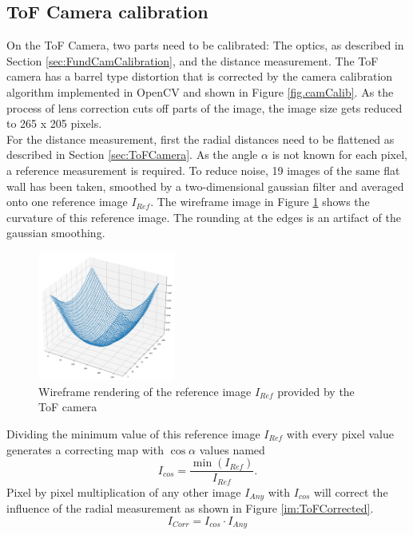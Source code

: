 \subsection{ToF Camera calibration}
\label{sec:ToFCalibration}
On the ToF Camera, two parts need to be calibrated: The optics, as described in Section \ref{sec:FundCamCalibration}, and the distance measurement. The ToF camera has a barrel type distortion that is corrected by the camera calibration algorithm implemented in OpenCV\cite{openCVCamCalib} and shown in Figure \ref{fig.camCalib}. As the process of lens correction cuts off parts of the image, the image size gets reduced to 265 x 205 pixels.\\
For the distance measurement, first the radial distances need to be flattened as described in Section \ref{sec:ToFCamera}. As the angle $\alpha$ is not known for each pixel, a reference measurement is required. To reduce noise, 19 images of the same flat wall has been taken, smoothed by a two-dimensional gaussian filter and averaged onto one reference image $I_{Ref}$. The wireframe image in Figure \ref{im:ToFRaw} shows the curvature of this reference image. The rounding at the edges is an artifact of the gaussian smoothing.\\
\begin{figure}[H]
    \centering
    \includegraphics[width=0.4\textwidth]{images/raw_tof_radial.png}
    \caption{Wireframe rendering of the reference image $I_{Ref}$ provided by the ToF camera}
    \label{im:ToFRaw}
\end{figure}
Dividing the minimum value of this reference image $I_{Ref}$ with every pixel value generates a correcting map with $\cos \alpha$ values named
\begin{equation*}
    I_{cos} = \frac{\min (I_{Ref}) }{I_{Ref}}.
\end{equation*}
Pixel by pixel multiplication of any other image $I_{Any}$ with $I_{cos}$ will correct the influence of the radial measurement as shown in Figure \ref{im:ToFCorrected}. 
\begin{equation*}
    I_{Corr} = I_{cos}\cdot I_{Any}
\end{equation*}
